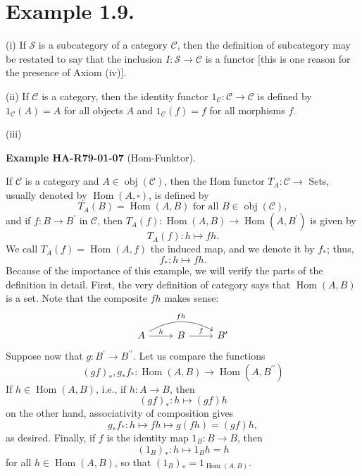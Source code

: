 \documentclass[10pt, letterpaper]{article}
\newcommand{\CustomHeading}[3]{%
  \par\medskip\noindent%
  \textbf{#1 #2} \textnormal{(#3)}.\enskip%
}
\newenvironment{EXA}[2]{\begin{unitbox}\CustomHeading{Example}{#1}{#2}}{\end{unitbox}}
\begin{document}
\section*{Example 1.9.}
(i) If $\mathcal{S}$ is a subcategory of a category $\mathcal{C}$, then the definition of subcategory may be restated to say that the inclusion $I: \mathcal{S} \rightarrow \mathcal{C}$ is a functor [this is one reason for the presence of Axiom (iv)].


(ii) If $\mathcal{C}$ is a category, then the identity functor $1_{\mathcal{C}}: \mathcal{C} \rightarrow \mathcal{C}$ is defined by $1_{\mathcal{C}}(A)=A$ for all objects $A$ and $1_{\mathcal{C}}(f)=f$ for all morphisms $f$.


(iii) 



\begin{EXA}{HA-R79-01-07}{Hom-Funktor}
If $\mathcal{C}$ is a category and $A \in \operatorname{obj}(\mathcal{C})$, then the Hom functor $T_{A}: \mathcal{C} \rightarrow$ Sets, usually denoted by $\operatorname{Hom}(A, \square)$, is defined by
$$
T_{A}(B)=\operatorname{Hom}(A, B) \text { for all } B \in \operatorname{obj}(\mathcal{C}),
$$
and if $f: B \rightarrow B^{\prime}$ in $\mathcal{C}$, then $T_{A}(f): \operatorname{Hom}(A, B) \rightarrow \operatorname{Hom}\left(A, B^{\prime}\right)$ is given by
$$
T_{A}(f): h \mapsto f h .
$$
We call $T_{A}(f)=\operatorname{Hom}(A, f)$ the induced map, and we denote it by $f_{*}$; thus,
$$
f_{*}: h \mapsto f h .
$$
Because of the importance of this example, we will verify the parts of the definition in detail. First, the very definition of category says that $\operatorname{Hom}(A, B)$ is a set. Note that the composite $f h$ makes sense:
\[
\begin{tikzcd}[row sep=small]
A \arrow[r, "h"] \arrow[rr, bend left=30, "fh"] & B \arrow[r, "f"] & B'
\end{tikzcd}
\]
Suppose now that $g: B^{\prime} \rightarrow B^{\prime \prime}$. Let us compare the functions
$$
(g f)_{*}, g_{*} f_{*}: \operatorname{Hom}(A, B) \rightarrow \operatorname{Hom}\left(A, B^{\prime \prime}\right)
$$
If $h \in \operatorname{Hom}(A, B)$, i.e., if $h: A \rightarrow B$, then
$$
(g f)_{*}: h \mapsto(g f) h
$$
on the other hand, associativity of composition gives
$$
g_{*} f_{*}: h \mapsto f h \mapsto g(f h)=(g f) h,
$$
as desired. Finally, if $f$ is the identity map $1_{B}: B \rightarrow B$, then
$$
\left(1_{B}\right)_{*}: h \mapsto 1_{B} h=h
$$
for all $h \in \operatorname{Hom}(A, B)$, so that $\left(1_{B}\right)_{*}=1_{\operatorname{Hom}(A, B)}$.
\end{EXA}
\end{document}
